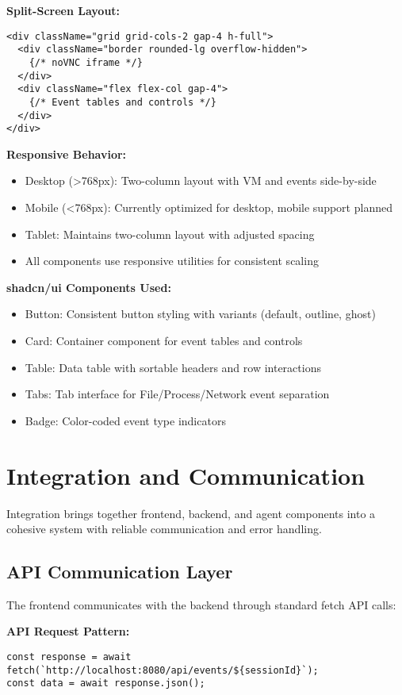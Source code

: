 \textbf{Split-Screen Layout:}
\begin{verbatim}
<div className="grid grid-cols-2 gap-4 h-full">
  <div className="border rounded-lg overflow-hidden">
    {/* noVNC iframe */}
  </div>
  <div className="flex flex-col gap-4">
    {/* Event tables and controls */}
  </div>
</div>
\end{verbatim}

\textbf{Responsive Behavior:}
\begin{itemize}
    \item Desktop (>768px): Two-column layout with VM and events side-by-side
    \item Mobile (<768px): Currently optimized for desktop, mobile support planned
    \item Tablet: Maintains two-column layout with adjusted spacing
    \item All components use responsive utilities for consistent scaling
\end{itemize}

\textbf{shadcn/ui Components Used:}
\begin{itemize}
    \item Button: Consistent button styling with variants (default, outline, ghost)
    \item Card: Container component for event tables and controls
    \item Table: Data table with sortable headers and row interactions
    \item Tabs: Tab interface for File/Process/Network event separation
    \item Badge: Color-coded event type indicators
\end{itemize}

\section{Integration and Communication}

Integration brings together frontend, backend, and agent components into a cohesive system with reliable communication and error handling.

\subsection{API Communication Layer}

The frontend communicates with the backend through standard fetch API calls:

\textbf{API Request Pattern:}
\begin{verbatim}
const response = await fetch(`http://localhost:8080/api/events/${sessionId}`);
const data = await response.json();
\end{verbatim}

